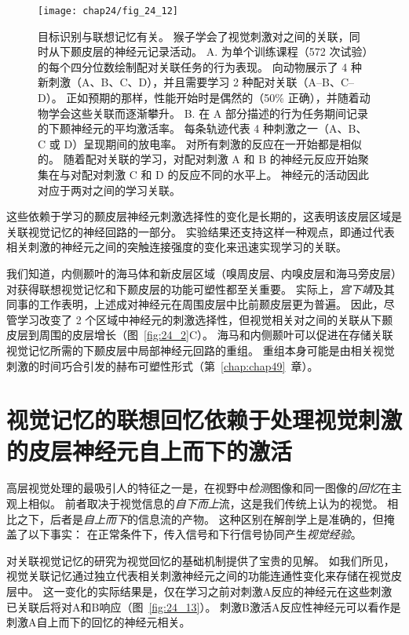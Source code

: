 \begin{figure}[htbp]
	\centering
	\texttt{[image: chap24/fig\_24\_12]}
	\caption{目标识别与联想记忆有关。
		猴子学会了视觉刺激对之间的关联，同时从下颞皮层的神经元记录活动。
		A. 为单个训练课程（572 次试验）的每个四分位数绘制配对关联任务的行为表现。
		向动物展示了 4 种新刺激（A、B、C、D），并且需要学习 2 种配对关联（A–B、C–D）。
		正如预期的那样，性能开始时是偶然的（50\% 正确），并随着动物学会这些关联而逐渐攀升。
		B. 在 A 部分描述的行为任务期间记录的下颞神经元的平均激活率。
		每条轨迹代表 4 种刺激之一（A、B、C 或 D）呈现期间的放电率。
		对所有刺激的反应在一开始都是相似的。
		随着配对关联的学习，对配对刺激 A 和 B 的神经元反应开始聚集在与对配对刺激 C 和 D 的反应不同的水平上。
		神经元的活动因此对应于两对之间的学习关联。}
	\label{fig:24_12}
\end{figure}


这些依赖于学习的颞皮层神经元刺激选择性的变化是长期的，这表明该皮层区域是关联视觉记忆的神经回路的一部分。
实验结果还支持这样一种观点，即通过代表相关刺激的神经元之间的突触连接强度的变化来迅速实现学习的关联。


我们知道，内侧颞叶的海马体和新皮层区域（嗅周皮层、内嗅皮层和海马旁皮层）对获得联想视觉记忆和下颞皮层的功能可塑性都至关重要。
实际上，\textit{宫下靖}及其同事的工作表明，上述成对神经元在周围皮层中比前颞皮层更为普遍。
因此，尽管学习改变了 2 个区域中神经元的刺激选择性，但视觉相关对之间的关联从下颞皮层到周围的皮层增长（图~\ref{fig:24_2}C）。
海马和内侧颞叶可以促进在存储关联视觉记忆所需的下颞皮层中局部神经元回路的重组。
重组本身可能是由相关视觉刺激的时间巧合引发的赫布可塑性形式（第~\ref{chap:chap49}~章）。



\section{视觉记忆的联想回忆依赖于处理视觉刺激的皮层神经元自上而下的激活}

高层视觉处理的最吸引人的特征之一是，在视野中\textit{检测}图像和同一图像的\textit{回忆}在主观上相似。
前者取决于视觉信息的\textit{自下而上}流，这是我们传统上认为的视觉。
相比之下，后者是\textit{自上而下}的信息流的产物。
这种区别在解剖学上是准确的，但掩盖了以下事实：
在正常条件下，传入信号和下行信号协同产生\textit{视觉经验}。


对关联视觉记忆的研究为视觉回忆的基础机制提供了宝贵的见解。
如我们所见，视觉关联记忆通过独立代表相关刺激神经元之间的功能连通性变化来存储在视觉皮层中。
这一变化的实际结果是，仅在学习之前对刺激A反应的神经元在这些刺激已关联后将对A和B响应（图~\ref{fig:24_13}）。
刺激B激活A反应性神经元可以看作是刺激A自上而下的回忆的神经元相关。


